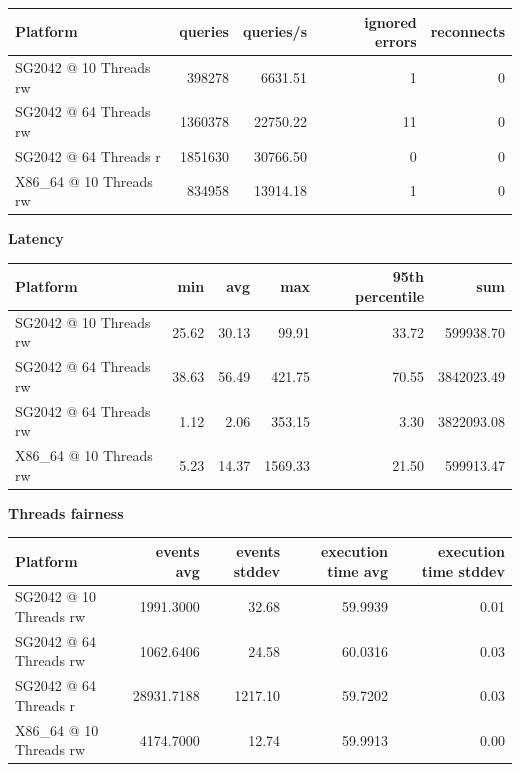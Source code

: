 \documentclass{article}
\begin{document}
\begin{table}[h!]
\centering
\begin{tabular}{|l|r|r|r|r|}
\hline
Platform & queries & queries/s & ignored errors & reconnects \\
\hline
SG2042 @ 10 Threads rw & 398278 & 6631.51 & 1 & 0 \\
SG2042 @ 64 Threads rw & 1360378 & 22750.22 & 11 & 0 \\
SG2042 @ 64 Threads r  & 1851630 & 30766.50 & 0 & 0 \\
X86\_64 @ 10 Threads rw & 834958 & 13914.18 & 1 & 0 \\
\hline
\end{tabular}
\end{table}


\textbf{Latency}

\begin{table}[H]
\centering
\begin{tabular}{|l|r|r|r|r|r|}
\hline
Platform & min & avg & max & 95th percentile & sum \\
\hline
SG2042 @ 10 Threads rw & 25.62 & 30.13 & 99.91 & 33.72 & 599938.70 \\
SG2042 @ 64 Threads rw & 38.63 & 56.49 & 421.75 & 70.55 & 3842023.49 \\
SG2042 @ 64 Threads rw & 1.12 & 2.06 & 353.15 & 3.30 & 3822093.08 \\
X86\_64 @ 10 Threads rw & 5.23 & 14.37 & 1569.33 & 21.50 & 599913.47 \\
\hline
\end{tabular}
\end{table}

\textbf{Threads fairness}

\begin{table}[h!]
\centering
\begin{tabular}{|l|r|r|r|r|}
\hline
Platform & events avg & events stddev & execution time avg & execution time stddev \\
\hline
SG2042 @ 10 Threads rw & 1991.3000 & 32.68 & 59.9939 & 0.01 \\
SG2042 @ 64 Threads rw & 1062.6406 & 24.58 & 60.0316 & 0.03 \\
SG2042 @ 64 Threads r & 28931.7188 & 1217.10 & 59.7202 & 0.03 \\
X86\_64 @ 10 Threads rw & 4174.7000 & 12.74 & 59.9913 & 0.00 \\
\hline
\end{tabular}
\end{table}
\end{document}
